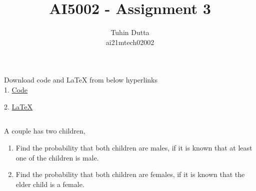 \documentclass[journal,12pt,twocolumn]{IEEEtran}
\begin{document}
\providecommand{\mtx}[1]{\mathbf{#1}}
\providecommand{\fourier}{\overset{\mathcal{F}}{ \rightleftharpoons}}
\providecommand{\system}{\overset{\mathcal{H}}{ \longleftrightarrow}}
\newcommand{\solution}{\noindent \textbf{Solution: }}
\newcommand{\cosec}{\,\text{cosec}\,}
\providecommand{\dec}[2]{\ensuremath{\overset{#1}{\underset{#2}{\gtrless}}}}
\newcommand{\myvec}[1]{\ensuremath{\begin{pmatrix}#1\end{pmatrix}}}
\newcommand{\mydet}[1]{\ensuremath{\begin{vmatrix}#1\end{vmatrix}}}
\makeatletter
{}
\makeatother
\let\StandardTheFigure\thefigure
\let\vec\mathbf
\renewcommand{\thefigure}{\theproblem}
\def\putbox#1#2#3{\makebox[0in][l]{\makebox[#1][l]{}\raisebox{\baselineskip}[0in][0in]{\raisebox{#2}[0in][0in]{#3}}}}
     \def\rightbox#1{\makebox[0in][r]{#1}}
     \def\centbox#1{\makebox[0in]{#1}}
     \def\topbox#1{\raisebox{-\baselineskip}[0in][0in]{#1}}
     \def\midbox#1{\raisebox{-0.5\baselineskip}[0in][0in]{#1}}
\vspace{3cm}
\title{AI5002 - Assignment 3}
\author{Tuhin Dutta\\ ai21mtech02002}
\maketitle
\newpage
\bigskip
\renewcommand{\thefigure}{\theenumi}
\renewcommand{\thetable}{\theenumi}
\begin{mdframed}
Download code and LaTeX from below hyperlinks\\
1. \href{https://github.com/Tauhait/AI5002/tree/main/Assignment-3/Codes}{Code}


2. \href{https://github.com/Tauhait/AI5002/tree/main/Assignment-3/LaTeX}{LaTeX}
\end{mdframed}
\subsection*{}
A couple has two children,\\
\begin{enumerate}[label=\roman*.]
\item Find the probability that both children are
males, if it is known that at least one of the
children is male.
\item Find the probability that both children are
females, if it is known that the elder child is
a female.
\end{enumerate}
\end{document}
